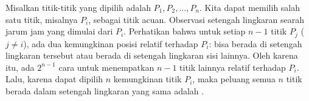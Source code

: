 
\begin{solusi}
Misalkan titik-titik yang dipilih adalah $P_1, P_2, \dots, P_n$. Kita dapat memilih salah satu titik, misalnya $P_i$, sebagai titik acuan. Observasi setengah lingkaran searah jarum jam yang dimulai dari $P_i$. Perhatikan bahwa untuk setiap $n-1$ titik $P_j$ ($j \neq i$), ada dua kemungkinan posisi relatif terhadap $P_i$: bisa berada di setengah lingkaran tersebut atau berada di setengah lingkaran sisi lainnya. Oleh karena itu, ada $2^{n-1}$ cara untuk menempatkan $n-1$ titik lainnya relatif terhadap $P_i$. Lalu, karena dapat dipilih $n$ kemungkinan titik $P_i$, maka peluang semua $n$ titik berada dalam setengah lingkaran yang sama adalah .
\end{solusi}
